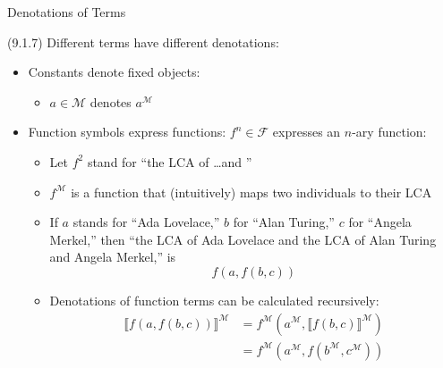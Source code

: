 \begin{frame}{Denotations of Terms}

	(9.1.7) Different terms have different denotations:
		
			\begin{itemize}
			
				\item Constants denote fixed objects: 
				
				\begin{itemize}
				
					\item $a\in\mathcal{M}$ denotes $a^\mathcal{M}$
				
				\end{itemize}
				
				\item Function symbols express functions: $f^n\in\mathcal{F}$ expresses an $n$-ary function: 
				
				\begin{itemize}
				
					\item Let $f^2$ stand for ``the LCA of \dots and \underline{\phantom{\dots}}''
					
					\item $f^\mathcal{M}$ is a function that (intuitively) maps two individuals to their LCA 
					
					\item If $a$ stands for ``Ada Lovelace,'' $b$ for ``Alan Turing,'' $c$ for ``Angela Merkel,'' then ``the LCA of Ada Lovelace and the LCA of Alan Turing and Angela Merkel,'' is \[f(a,f(b,c))\]
					
					\item Denotations of function terms can be calculated recursively:
					\begin{align*}
	\llbracket f(a,f(b,c))\rrbracket^\mathcal{M}&=f^\mathcal{M}(a^\mathcal{M}, \llbracket f(b,c)\rrbracket^\mathcal{M})\\
	&=f^\mathcal{M}(a^\mathcal{M}, f(b^\mathcal{M}, c^\mathcal{M}))
	\end{align*}
				
				\end{itemize}
			
			\end{itemize}

\end{frame}

